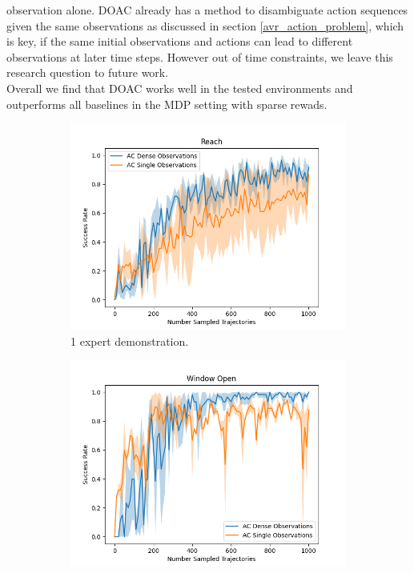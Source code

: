 observation alone. DOAC already has a method to disambiguate action sequences given the same observations as discussed in section \ref{avr_action_problem}, which is key, if the same initial 
observations and actions can lead to different observations at later time steps. However out of time constraints, we leave this research question to future work.\\
Overall we find that DOAC works well in the tested environments and outperforms all baselines in the MDP setting with sparse rewads.
\begin{figure}[htbp]
  \centering
  \begin{subfigure}[t]{0.32\textwidth}
    \includegraphics[width=\textwidth]{images/dense_vs_sparse_1/Reach.png}
    \caption{1 expert demonstration.}
  \end{subfigure}
  \medskip
  \begin{subfigure}[t]{0.32\textwidth}
    \includegraphics[width=\textwidth]{images/dense_vs_sparse_1/Window Open.png}

\end{subfigure}
\end{figure}
